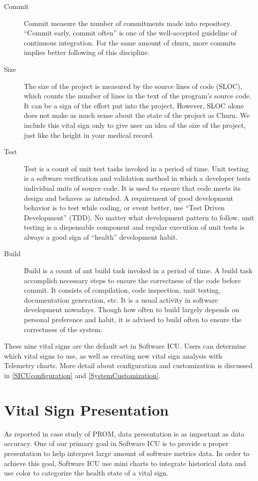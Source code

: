 \begin{description}
\item[Commit] 
Commit measure the number of commitments made into repository. ``Commit early, commit often'' is one of the well-accepted guideline of continuous integration. For the same amount of churn, more commits implies better following of this discipline.

\item[Size] 
The size of the project is measured by the source lines of code (SLOC), which counts the number of lines in the text of the program's source code. It can be a sign of the effort put into the project, However, SLOC alone does not make as much sense about the state of the project as Churn. We include this vital sign only to give user an idea of the size of the project, just like the height in your medical record.

\item[Test] 
Test is a count of unit test tasks invoked in a period of time. Unit testing is a software verification and validation method in which a developer tests individual units of source code. It is used to ensure that code meets its design and behaves as intended. A requirement of good development behavior is to test while coding, or event better, use ``Test Driven Development'' (TDD). No matter what development pattern to follow, unit testing is a dispensable component and regular execution of unit tests is always a good sign of ``health'' development habit.

\item[Build] 
Build is a count of ant build task invoked in a period of time. A build task accomplish necessary steps to ensure the correctness of the code before commit. It consists of compilation, code inspection, unit testing, documentation generation, etc. It is a usual activity in software development nowadays. Though how often to build largely depends on personal preference and habit, it is advised to build often to ensure the correctness of the system.

\end{description}

These nine vital signs are the default set in Software ICU. Users can determine which vital signs to use, as well as creating new vital sign analysis with Telemetry charts. More detail about configuration and customization is discussed in \autoref{SICUconfiguration} and \autoref{SystemCustomization}.

\section{Vital Sign Presentation}
\label{presentation}
As reported in case study of PROM, data presentation is as important as data accuracy\cite{prom09}. One of our primary goal in Software ICU is to provide a proper presentation to help interpret large amount of software metrics data. In order to achieve this goal, Software ICU use mini charts to integrate historical data and use color to categorize the health state of a vital sign.

